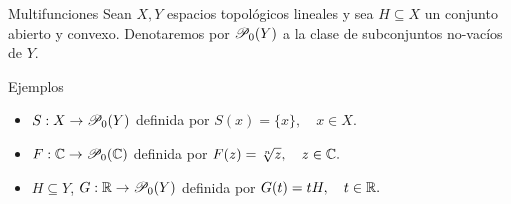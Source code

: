 \begin{frame}{Multifunciones}
  Sean $X, Y$ espacios topológicos lineales y sea 
  $H\subseteq X$ un conjunto abierto y convexo. Denotaremos 
  por $\P_0(Y)$ a la clase de subconjuntos no-vacíos 
  de $Y$.
  \begin{exampleblock}{Ejemplos}
    \begin{itemize}
      \item $S: X\to\P_0(Y)$ definida por $S(x) = \{x\}, \quad x\in X.$
      \item $F: \C\to\P_0(\C)$ definida por $F(z) = \sqrt[n]{z}, \quad z\in\C.$
      \item $H\subseteq Y$, $G: \R\to \P_0(Y)$ definida por $G(t) = tH, \quad t\in\R.$
    \end{itemize}
  \end{exampleblock}
    
\end{frame}